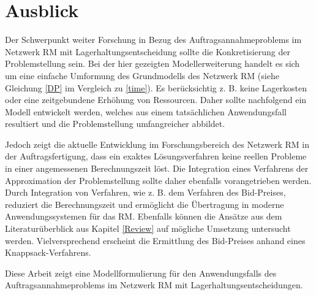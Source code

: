 \section*{Ausblick}

Der Schwerpunkt weiter Forschung in Bezug des Auftragsannahmeproblems im Netzwerk RM mit Lagerhaltungsentscheidung sollte die Konkretisierung der Problemstellung sein. Bei der hier gezeigten Modellerweiterung handelt es sich um eine einfache Umformung des Grundmodells des Netzwerk RM (siehe Gleichung \eqref{DP} im Vergleich zu \eqref{time}). Es berücksichtig z. B. keine Lagerkosten oder eine zeitgebundene Erhöhung von Ressourcen. Daher sollte nachfolgend ein Modell entwickelt werden, welches aus einem tatsächlichen Anwendungsfall resultiert und die Problemstellung umfangreicher abbildet.

Jedoch zeigt die aktuelle Entwicklung im Forschungsbereich des Netzwerk RM in der Auftragsfertigung, dass ein exaktes Lösungsverfahren keine reellen Probleme in einer angemessenen Berechnungszeit löst. Die Integration eines Verfahrens der Approximation der Problemstellung sollte daher ebenfalls vorangetrieben werden. Durch Integration von Verfahren, wie z. B. dem Verfahren des Bid-Preises, reduziert die Berechnungszeit und ermöglicht die Übertragung in moderne Anwendungssystemen für das RM. Ebenfalls können die Ansätze aus dem Literaturüberblick aus Kapitel \ref{Review} auf mögliche Umsetzung untersucht werden. Vielversprechend erscheint die Ermittlung des Bid-Preises anhand eines Knappsack-Verfahrens.

Diese Arbeit zeigt eine Modellformulierung für den Anwendungsfalls des Auftragsannahmeproblems im Netzwerk RM mit Lagerhaltungsentscheidungen. 



